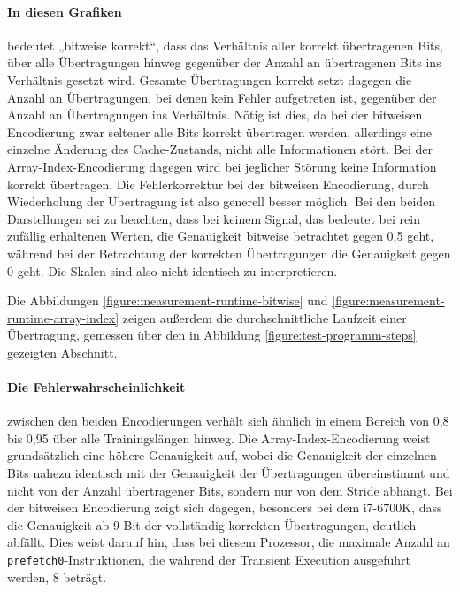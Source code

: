 \paragraph{In diesen Grafiken}
bedeutet „bitweise korrekt“, dass das Verhältnis
aller korrekt übertragenen Bits, über alle Übertragungen hinweg
gegenüber der Anzahl an übertragenen Bits ins Verhältnis gesetzt
wird. Gesamte Übertragungen korrekt setzt dagegen die Anzahl
an Übertragungen, bei denen kein Fehler aufgetreten ist,
gegenüber der Anzahl an Übertragungen ins Verhältnis. Nötig ist
dies, da bei der bitweisen Encodierung
zwar seltener alle Bits korrekt übertragen werden, allerdings eine
einzelne Änderung des Cache-Zustands, nicht alle Informationen
stört. Bei der Array-Index-Encodierung dagegen wird bei
jeglicher Störung keine Information korrekt übertragen. Die
Fehlerkorrektur bei der bitweisen Encodierung, durch
Wiederholung der Übertragung ist also generell besser möglich.
Bei den beiden Darstellungen sei zu beachten, dass bei keinem
Signal, das bedeutet bei rein zufällig erhaltenen Werten, die
Genauigkeit bitweise betrachtet gegen 0,5 geht, während bei
der Betrachtung der korrekten Übertragungen die Genauigkeit
gegen 0 geht. Die Skalen sind also nicht identisch zu
interpretieren.

Die Abbildungen \ref{figure:measurement-runtime-bitwise} und
\ref{figure:measurement-runtime-array-index} zeigen außerdem
die durchschnittliche Laufzeit einer Übertragung, gemessen
über den in Abbildung \ref{figure:test-programm-steps}
gezeigten Abschnitt.

\paragraph{Die Fehlerwahrscheinlichkeit}\label{paragraph:error-probability}
zwischen den beiden Encodierungen verhält sich ähnlich in einem
Bereich von 0,8 bis 0,95 über alle Trainingslängen hinweg.
Die Array-Index-Encodierung weist grundsätzlich eine höhere
Genauigkeit auf, wobei die Genauigkeit der einzelnen Bits nahezu
identisch mit der Genauigkeit der Übertragungen übereinstimmt
und nicht von der Anzahl übertragener Bits, sondern nur von dem
Stride abhängt. Bei der bitweisen Encodierung zeigt sich dagegen,
besonders bei dem i7-6700K, dass
die Genauigkeit ab 9 Bit der vollständig korrekten
Übertragungen, deutlich abfällt. Dies weist darauf hin, dass bei
diesem Prozessor, die maximale Anzahl an
\verb|prefetch0|-Instruktionen, die während der Transient Execution
ausgeführt werden, 8 beträgt.

